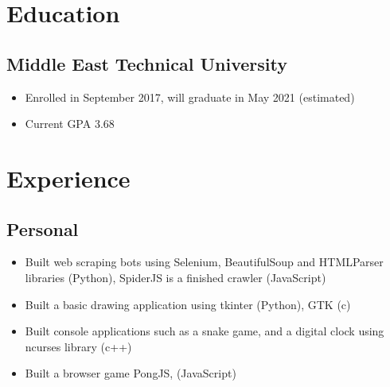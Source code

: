 \documentclass[]{props}
\begin{document}


\vspace{-1cm}
\section{Education}
\subsection{Middle East Technical University}
\begin{itemize}
    \item[] Enrolled in September 2017, will graduate in May 2021 (estimated)
    \item[] Current GPA 3.68
\end{itemize}

\section{Experience}
\subsection{Personal}

\begin{itemize}
    \item[] Built web scraping bots using Selenium, BeautifulSoup and HTMLParser libraries (Python), SpiderJS is a finished crawler (JavaScript)
    \item[] Built a basic drawing application using tkinter (Python), GTK (c)
    \item[] Built console applications such as a snake game, and a digital clock using ncurses library (c++)
    \item[] Built a browser game PongJS, (JavaScript)
\end{itemize}
\end{document}
